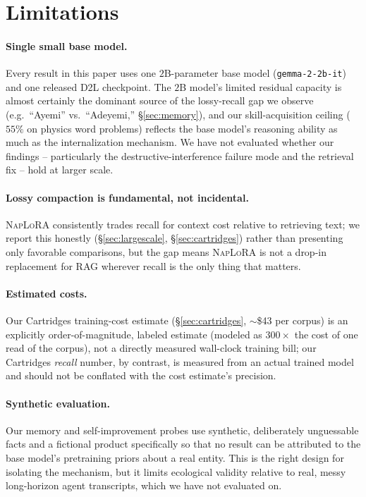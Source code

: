 \documentclass[11pt]{article}
\newcommand{\DTL}{D2L}
\newcommand{\naplora}{\textsc{NapLoRA}}
\newcommand{\mt}[1]{\texttt{\small #1}}
\begin{document}
\section*{Limitations}

\paragraph{Single small base model.} Every result in this paper uses one $2$B-parameter base model (\mt{gemma-2-2b-it}) and one released \DTL{} checkpoint. The $2$B model's limited residual capacity is almost certainly the dominant source of the lossy-recall gap we observe (e.g.\ ``Ayemi'' vs.\ ``Adeyemi,'' \S\ref{sec:memory}), and our skill-acquisition ceiling ($55\%$ on physics word problems) reflects the base model's reasoning ability as much as the internalization mechanism. We have not evaluated whether our findings -- particularly the destructive-interference failure mode and the retrieval fix -- hold at larger scale.

\paragraph{Lossy compaction is fundamental, not incidental.} \naplora{} consistently trades recall for context cost relative to retrieving text; we report this honestly (\S\ref{sec:largescale}, \S\ref{sec:cartridges}) rather than presenting only favorable comparisons, but the gap means \naplora{} is not a drop-in replacement for RAG wherever recall is the only thing that matters.

\paragraph{Estimated costs.} Our Cartridges training-cost estimate (\S\ref{sec:cartridges}, $\sim$\$43 per corpus) is an explicitly order-of-magnitude, labeled estimate (modeled as $300\times$ the cost of one read of the corpus), not a directly measured wall-clock training bill; our Cartridges \emph{recall} number, by contrast, is measured from an actual trained model and should not be conflated with the cost estimate's precision.

\paragraph{Synthetic evaluation.} Our memory and self-improvement probes use synthetic, deliberately unguessable facts and a fictional product specifically so that no result can be attributed to the base model's pretraining priors about a real entity. This is the right design for isolating the mechanism, but it limits ecological validity relative to real, messy long-horizon agent transcripts, which we have not evaluated on.
\end{document}
